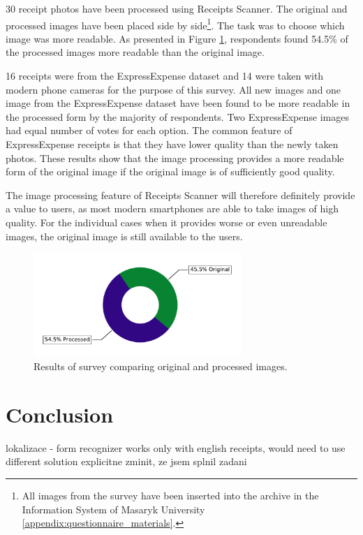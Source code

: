 \documentclass[
  digital, %
  table,   %
  oneside, %
  lof,     %
  lot,     %
]{fithesis3}
\begin{document}
30 receipt photos have been processed using Receipts Scanner. The original and processed images have been placed side by side\footnote{All images from the survey have been inserted into the archive in the Information System of Masaryk University \ref{appendix:questionnaire_materials}.}. The task was to choose which image was more readable. As presented in Figure \ref{fig:which_image_is_more_readable}, respondents found 54.5\% of the processed images more readable than the original image. 

16 receipts were from the ExpressExpense \cite{ExpressExpense2019Receipt} dataset and 14 were taken with modern phone cameras for the purpose of this survey.
All new images and one image from the ExpressExpense dataset have been found to be more readable in the processed form by the majority of respondents. Two ExpressExpense images had equal number of votes for each option. The common feature of ExpressExpense receipts is that they have lower quality than the newly taken photos. These results show that the image processing provides a more readable form of the original image if the original image is of sufficiently good quality. 

The image processing feature of Receipts Scanner will therefore definitely provide a value to users, as most modern smartphones are able to take images of high quality. For the individual cases when it provides worse or even unreadable images, the original image is still available to the users.

\begin{figure}
    \begin{center}
        \includegraphics[width=0.7\textwidth]{figures/graphs/which_image_is_more_readable}
    \end{center}
    \caption{Results of survey comparing original and processed images.}
    \label{fig:which_image_is_more_readable}
\end{figure}

\chapter{Conclusion}
lokalizace - form recognizer works only with english receipts, would need to use different solution
explicitne zminit, ze jsem splnil zadani 
\end{document}
